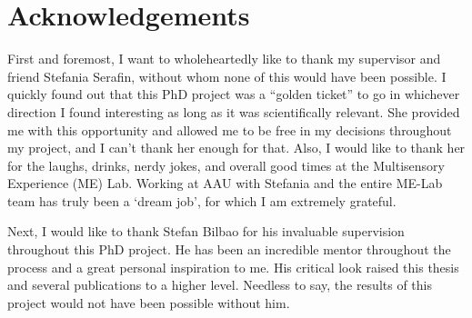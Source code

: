 

\pagebreak
\section*{Acknowledgements}
First and foremost, I want to wholeheartedly like to thank my supervisor and friend Stefania Serafin, without whom none of this would have been possible. I quickly found out that this PhD project was a ``golden ticket'' to go in whichever direction I found interesting as long as it was scientifically relevant. She provided me with this opportunity and allowed me to be free in my decisions throughout my project, and I can't thank her enough for that. Also, I would like to thank her for the laughs, drinks, nerdy jokes, and overall good times at the Multisensory Experience (ME) Lab. Working at AAU with Stefania and the entire ME-Lab team has truly been a `dream job', for which I am extremely grateful. 



Next, I would like to thank Stefan Bilbao for his invaluable supervision throughout this PhD project. He has been an incredible mentor throughout the process and a great personal inspiration to me. His critical look raised this thesis and several publications to a higher level. Needless to say, the results of this project would not have been possible without him. 


